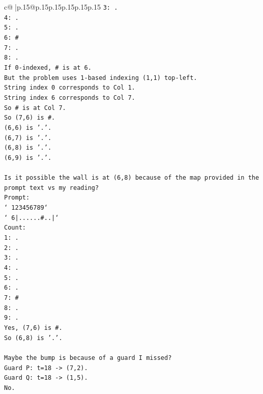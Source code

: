 \documentclass{article}
\begin{document}
{\begin{supertabular}{c@{$\;$}|p{.15\linewidth}@{}p{.15\linewidth}p{.15\linewidth}p{.15\linewidth}p{.15\linewidth}p{.15\linewidth}}
{{{\texttt{3: .} \\
\texttt{4: .} \\
\texttt{5: .} \\
\texttt{6: \#} \\
\texttt{7: .} \\
\texttt{8: .} \\
\texttt{If 0{-}indexed, \# is at 6.} \\
\texttt{But the problem uses 1{-}based indexing (1,1) top{-}left.} \\
\texttt{String index 0 corresponds to Col 1.} \\
\texttt{String index 6 corresponds to Col 7.} \\
\texttt{So \# is at Col 7.} \\
\texttt{So (7,6) is \#.} \\
\texttt{(6,6) is '.'.} \\
\texttt{(6,7) is '.'.} \\
\texttt{(6,8) is '.'.} \\
\texttt{(6,9) is '.'.} \\
\\ 
\texttt{Is it possible the wall is at (6,8) because of the map provided in the prompt text vs my reading?} \\
\texttt{Prompt:} \\
\texttt{` 123456789`} \\
\texttt{` 6|......\#..|`} \\
\texttt{Count:} \\
\texttt{1: .} \\
\texttt{2: .} \\
\texttt{3: .} \\
\texttt{4: .} \\
\texttt{5: .} \\
\texttt{6: .} \\
\texttt{7: \#} \\
\texttt{8: .} \\
\texttt{9: .} \\
\texttt{Yes, (7,6) is \#.} \\
\texttt{So (6,8) is '.'.} \\
\\ 
\texttt{Maybe the bump is because of a guard I missed?} \\
\texttt{Guard P: t=18 {-}> (7,2).} \\
\texttt{Guard Q: t=18 {-}> (1,5).} \\
\texttt{No.} \\
\\ 
}}}
\end{supertabular}}
\end{document}

